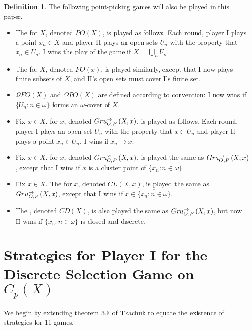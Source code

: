 \documentclass{amsart}
\theoremstyle{plain}
\theoremstyle{definition}
\newtheorem{definition}[theorem]{Definition}
\theoremstyle{remark}
\theoremstyle{plain}
\theoremstyle{definition}
\theoremstyle{remark}
\begin{document}
\begin{definition}
 The following point-picking games will also be played in this paper.
  \begin{itemize}
   \item The  for \(X\), denoted \(PO(X)\), is played as follows. Each round, player I plays a point \(x_n \in X\) and player II plays an open sets \(U_n\) with the property that \(x_n \in U_n\). I wins the play of the game if \(X = \bigcup_n U_n\).
   \item The  for \(X\), denoted \(FO(x)\), is played similarly, except that I now plays finite subsets of \(X\), and II's open sets must cover I's finite set.
   \item \(\Omega FO(X)\) and \(\Omega PO(X)\) are defined according to convention: I now wins if \(\{U_n : n \in \omega\}\) forms an \(\omega\)-cover of \(X\).
   \item Fix \(x \in X\).  for \(x\), denoted \(Gru_{O,P}^{\to}\left({X},{x}\right)\), is played as follows. Each round, player I plays an open set \(U_n\) with the property that \(x \in U_n\) and player II plays a point \(x_n \in U_n\). I wins if \(x_n \to x\).
   \item Fix \(x \in X\).  for \(x\), denoted \(Gru_{O,P}^{\leadsto}\left({X},{x}\right)\), is played the same as \(Gru_{O,P}^{\to}\left({X},{x}\right)\), except that I wins if \(x\) is a cluster point of \(\{x_n : n \in \omega\}\).
   \item Fix \(x \in X\). The  for \(x\), denoted \(CL(X,x)\), is played the same as \(Gru_{O,P}^{\to}\left({X},{x}\right)\), except that I wins if \(x \in \overline{\{x_n : n \in \omega\}}\).
   \item The , denoted \(CD(X)\), is also played the same as \(Gru_{O,P}^{\to}\left({X},{x}\right)\), but now II wins if \(\{x_n : n \in \omega\}\) is closed and discrete.
 \end{itemize}
\end{definition}

\section{Strategies for Player I for the Discrete Selection Game on \(C_p(X)\)}

We begin by extending theorem 3.8 of Tkachuk to equate the existence of strategies for 11 games.
\end{document}
